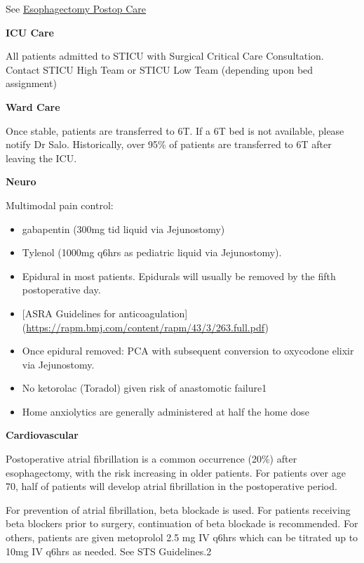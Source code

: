 \documentclass[
  letterpaper,
]{scrbook}
\providecommand{\tightlist}{%
  \setlength{\itemsep}{0pt}\setlength{\parskip}{0pt}}
\begin{document}
See
\href{https://gisurgonc.github.io/talks/eso_postop_care.htm}{Esophagectomy
Postop Care}

\textbf{ICU Care}

All patients admitted to STICU with Surgical Critical Care Consultation.
Contact STICU High Team or STICU Low Team (depending upon bed
assignment)

\textbf{Ward Care}

Once stable, patients are transferred to 6T. If a 6T bed is not
available, please notify Dr Salo. Historically, over 95\% of patients
are transferred to 6T after leaving the ICU.

\textbf{Neuro}

Multimodal pain control:

\begin{itemize}
\tightlist
\item
  gabapentin (300mg tid liquid via Jejunostomy)
\item
  Tylenol (1000mg q6hrs as pediatric liquid via Jejunostomy).
\item
  Epidural in most patients. Epidurals will usually be removed by the
  fifth postoperative day.
\item
  {[}ASRA Guidelines for anticoagulation{]}
  (\url{https://rapm.bmj.com/content/rapm/43/3/263.full.pdf})
\item
  Once epidural removed: PCA with subsequent conversion to oxycodone
  elixir via Jejunostomy.
\item
  No ketorolac (Toradol) given risk of anastomotic
  failure\hspace{0pt}1\hspace{0pt}
\item
  Home anxiolytics are generally administered at half the home dose
\end{itemize}

\textbf{Cardiovascular}

Postoperative atrial fibrillation is a common occurrence (20\%) after
esophagectomy, with the risk increasing in older patients. For patients
over age 70, half of patients will develop atrial fibrillation in the
postoperative period.

For prevention of atrial fibrillation, beta blockade is used. For
patients receiving beta blockers prior to surgery, continuation of beta
blockade is recommended. For others, patients are given metoprolol 2.5
mg IV q6hrs which can be titrated up to 10mg IV q6hrs as needed. See STS
Guidelines.\hspace{0pt}2\hspace{0pt}
\end{document}
